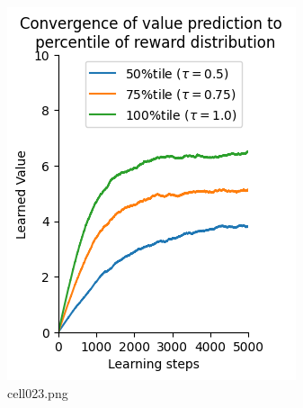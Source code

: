 \begin{figure}[ht]
	\centering
	\includegraphics[scale=0.8, max width=\linewidth]{./fig/bayesian-brain/quantile-expectile-regression/cell023.png}
	\caption{cell023.png}
	\label{cell023.png}
\end{figure}